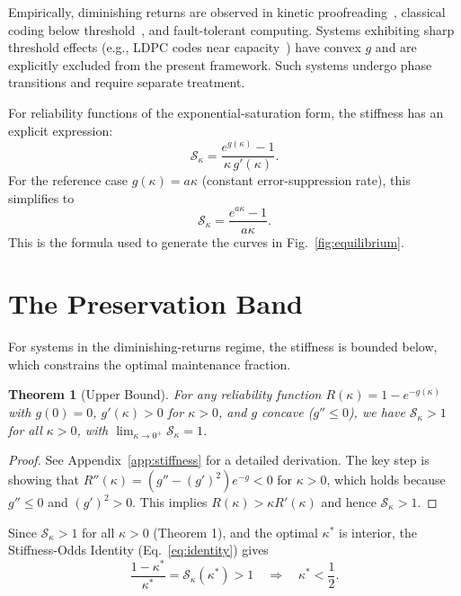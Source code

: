 \documentclass[11pt,twocolumn]{article}
\newtheorem{theorem}{Theorem}
\begin{document}
Empirically, diminishing returns are observed in kinetic proofreading~\cite{Hopfield1974}, classical coding below threshold~\cite{Gallager1965}, and fault-tolerant computing. Systems exhibiting sharp threshold effects (e.g., LDPC codes near capacity~\cite{Richardson2001}) have convex $g$ and are explicitly excluded from the present framework. Such systems undergo phase transitions and require separate treatment.

For reliability functions of the exponential-saturation form, the stiffness has an explicit expression:
\begin{equation}
\mathcal{S}_\kappa = \frac{e^{g(\kappa)} - 1}{\kappa\, g'(\kappa)}.
\label{eq:chi_explicit}
\end{equation}
For the reference case $g(\kappa) = a\kappa$ (constant error-suppression rate), this simplifies to
\begin{equation}
\mathcal{S}_\kappa = \frac{e^{a\kappa} - 1}{a\kappa}.
\label{eq:chi_linear}
\end{equation}
This is the formula used to generate the curves in Fig.~\ref{fig:equilibrium}.

\section{The Preservation Band}

For systems in the diminishing-returns regime, the stiffness is bounded below, which constrains the optimal maintenance fraction.

\begin{theorem}[Upper Bound]
\label{thm:upper}
For any reliability function $R(\kappa) = 1 - e^{-g(\kappa)}$ with $g(0) = 0$, $g'(\kappa) > 0$ for $\kappa > 0$, and $g$ concave ($g'' \leq 0$), we have $\mathcal{S}_\kappa > 1$ for all $\kappa > 0$, with $\lim_{\kappa \to 0^+} \mathcal{S}_\kappa = 1$.
\end{theorem}

\begin{proof}
See Appendix~\ref{app:stiffness} for a detailed derivation. The key step is showing that $R''(\kappa) = (g'' - (g')^2)e^{-g} < 0$ for $\kappa > 0$, which holds because $g'' \leq 0$ and $(g')^2 > 0$. This implies $R(\kappa) > \kappa R'(\kappa)$ and hence $\mathcal{S}_\kappa > 1$.
\end{proof}

Since $\mathcal{S}_\kappa > 1$ for all $\kappa > 0$ (Theorem 1), and the optimal $\kappa^*$ is interior, the Stiffness-Odds Identity (Eq.~\ref{eq:identity}) gives
\begin{equation}
\frac{1-\kappa^*}{\kappa^*} = \mathcal{S}_\kappa(\kappa^*) > 1 \quad\Longrightarrow\quad \kappa^* < \frac{1}{2}.
\label{eq:upper_bound}
\end{equation}
\end{document}
